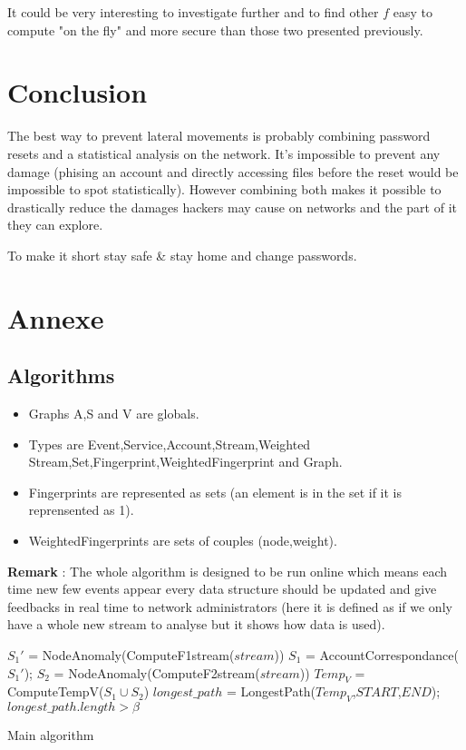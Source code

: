 \documentclass[11pt]{article}
\begin{document}
It could be very interesting to investigate further and to find other $f$ easy to compute "on the fly" and more secure than those two presented previously.

\section{Conclusion}
The best way to prevent lateral movements is probably combining password resets and a statistical analysis on the network. It's impossible to prevent any damage (phising an account and directly accessing files before the reset would be impossible to spot statistically). However combining both makes it possible to drastically reduce the damages hackers may cause on networks and the part of it they can explore. 

To make it short stay safe \& stay home and change passwords.




\newpage
\section{Annexe}
\subsection{Algorithms}
\begin{itemize}
\item Graphs A,S and V are globals. 

\item Types are Event,Service,Account,Stream,Weighted Stream,Set,Fingerprint,WeightedFingerprint and Graph.

\item Fingerprints are represented as sets (an element is in the set if it is reprensented as 1). 

\item WeightedFingerprints are sets of couples (node,weight).

\end{itemize}

\textbf{Remark} : The whole algorithm is designed to be run online which means each time new few events appear every data structure should be updated and give feedbacks in real time to network administrators (here it is defined as if we only have a whole new stream to analyse but it shows how data is used).

\begin{algorithm}[H]
 
 $S_1'$ = NodeAnomaly(ComputeF1stream($stream$))\;
 $S_1$ = AccountCorrespondance($S_1'$); 
 $S_2$ = NodeAnomaly(ComputeF2stream($stream$))\;
 $Temp_V$ = ComputeTempV($S_1\cup S_2$)\;
 $longest\_path$ = LongestPath($Temp_V$,$START$,$END$); 
 \Return $longest\_path.length>\beta$\;
 \caption{Main algorithm}
\end{algorithm}
\end{document}
